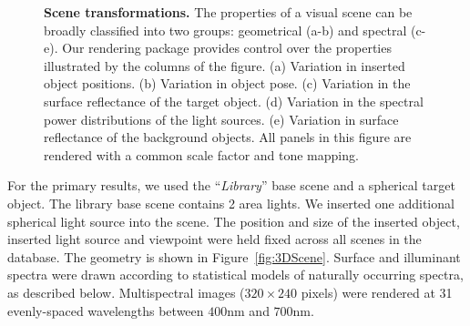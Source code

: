 \documentclass{jov}
\begin{document}
\begin{figure}
    \caption{{\bf Scene transformations.} The properties of a visual scene can be broadly classified into two groups: geometrical (a-b) and spectral (c-e). Our rendering package provides control over the properties illustrated by the columns of the figure. (a) Variation in inserted object positions. (b) Variation in object pose. (c) Variation in the surface reflectance of the target object. (d) Variation in the spectral power distributions of the light sources. (e) Variation in surface reflectance of the background objects. All panels in this figure are rendered with a common scale factor and tone mapping.
\label{fig:VWCCTransformations}}
\end{figure}

For the primary results, we used the ``{\it Library}'' base scene and a spherical target object.
The library base scene contains 2 area lights. 
We inserted one additional spherical light source into the scene.
The position and size of the inserted object, inserted light source and viewpoint were held fixed across all 
scenes in the database. The geometry is shown in Figure~\ref{fig:3DScene}.
Surface and illuminant spectra were drawn according to statistical models of naturally occurring spectra, as described below.
Multispectral images ($320 \times 240$ pixels) were rendered at 31 evenly-spaced wavelengths between $400$nm and $700$nm.
\end{document}
